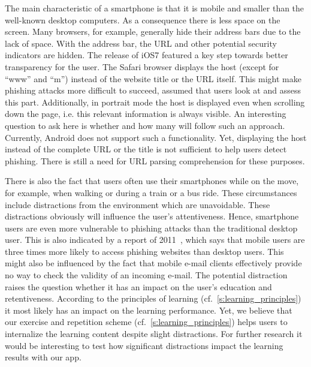 \begin{description}[leftmargin=0cm]
	\item[Mobility and Size.] The main characteristic of a smartphone is that it is mobile and smaller than the well-known desktop computers.
 As a consequence there is less space on the screen.
 Many browsers, for example, generally hide their address bars due to the lack of space.
 With the address bar, the URL and other potential security indicators are hidden.
The release of iOS7 featured a key step towards better transparency for the user.
The Safari browser displays the host (except for ``www'' and ``m'') instead of the website title or the URL itself.
This might make phishing attacks more difficult to succeed, assumed that users look at and assess this part.
Additionally, in portrait mode the host is displayed even when scrolling down the page, i.e. this relevant information is always visible.
An interesting question to ask here is whether and how many will follow such an approach.
Currently, Android does not support such a functionality. 
Yet, displaying the host instead of the complete URL or the title is not sufficient to help users detect phishing.
There is still a need for URL parsing comprehension for these purposes.
	\item[Distraction Caused by Mobility.] There is also the fact that users often use their smartphones while on the move, for example, when walking or  during a train or a bus ride.
 These circumstances include distractions from the environment which are unavoidable.
 These distractions obviously will influence the user's attentiveness.
 Hence, smartphone users are even more vulnerable to phishing attacks than the traditional desktop user.
 This is also indicated by a report of 2011~\cite{trusteer2011}, which says that mobile users are three times more likely to access phishing websites than desktop users.
 This might also be influenced by the fact that mobile e-mail clients effectively provide no way to check the validity of an incoming e-mail.
The potential distraction raises the question whether it has an impact on the user's education and retentiveness.
According to the principles of learning (cf.~\autoref{s:learning_principles}) it most likely has an impact on the learning performance.
Yet, we believe that our exercise and repetition scheme (cf.~\autoref{s:learning_principles}) helps users to internalize the learning content despite slight distractions.
For further research it would be interesting to test how significant distractions impact the learning results with our app.

\end{description}
